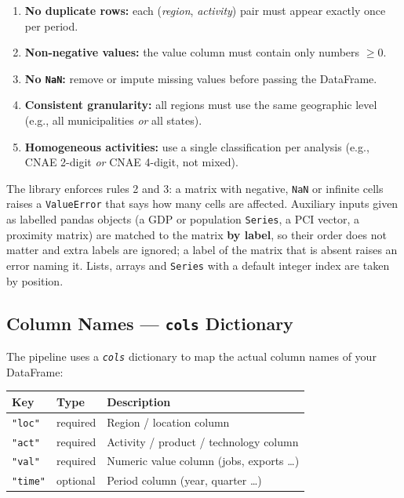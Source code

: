 \documentclass[12pt, a4paper]{article}
\newcommand{\argm}[1]{\textit{\texttt{#1}}}
\begin{document}
\begin{enumerate}[leftmargin=1.5em]
  \item \textbf{No duplicate rows:} each (\textit{region},
        \textit{activity}) pair must appear exactly once per period.
  \item \textbf{Non-negative values:} the value column must contain
        only numbers $\geq 0$.
  \item \textbf{No \texttt{NaN}:} remove or impute missing values before
        passing the DataFrame.
  \item \textbf{Consistent granularity:} all regions must use
        the same geographic level (e.g., all municipalities
        \textit{or} all states).
  \item \textbf{Homogeneous activities:} use a single classification
        per analysis (e.g., CNAE 2-digit \textit{or} CNAE 4-digit,
        not mixed).
\end{enumerate}

\begin{notebox}
  The library enforces rules 2 and 3: a matrix with negative, \texttt{NaN}
  or infinite cells raises a \texttt{ValueError} that says how many cells
  are affected. Auxiliary inputs given as labelled pandas objects (a GDP or
  population \texttt{Series}, a PCI vector, a proximity matrix) are matched
  to the matrix \textbf{by label}, so their order does not matter and extra
  labels are ignored; a label of the matrix that is absent raises an error
  naming it. Lists, arrays and \texttt{Series} with a default integer index
  are taken by position.
\end{notebox}

\subsection{Column Names --- \texttt{cols} Dictionary}

The pipeline uses a \argm{cols} dictionary to map the actual column
names of your DataFrame:

\begin{center}
\renewcommand{\arraystretch}{1.3}
\begin{tabular}{lll}
\toprule
\textbf{Key} & \textbf{Type} & \textbf{Description} \\
\midrule
\texttt{"loc"}  & required & Region / location column \\
\texttt{"act"}  & required & Activity / product / technology column \\
\texttt{"val"}  & required & Numeric value column (jobs, exports \ldots) \\
\texttt{"time"} & optional & Period column (year, quarter \ldots) \\
\bottomrule
\end{tabular}
\end{center}
\end{document}
